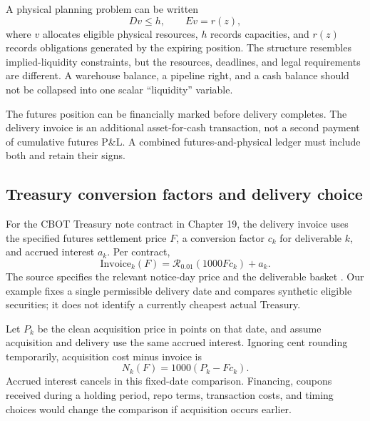 A physical planning problem can be written
\begin{equation}
 Dv\le h,\qquad Ev=r(z),
\end{equation}
where $v$ allocates eligible physical resources, $h$ records capacities, and $r(z)$ records obligations generated by the expiring position. The structure resembles implied-liquidity constraints, but the resources, deadlines, and legal requirements are different. A warehouse balance, a pipeline right, and a cash balance should not be collapsed into one scalar ``liquidity'' variable.

The futures position can be financially marked before delivery completes. The delivery invoice is an additional asset-for-cash transaction, not a second payment of cumulative futures P\&L. A combined futures-and-physical ledger must include both and retain their signs.

\subsection{Treasury conversion factors and delivery choice}

For the CBOT Treasury note contract in Chapter 19, the delivery invoice uses the specified futures settlement price $F$, a conversion factor $c_k$ for deliverable $k$, and accrued interest $a_k$. Per contract,
\begin{equation}
 \mathrm{Invoice}_k(F)=\mathcal R_{0.01}(1000Fc_k)+a_k.
\label{eq:invoice}
\end{equation}
The source specifies the relevant notice-day price and the deliverable basket \citep{CBOT19}. Our example fixes a single permissible delivery date and compares synthetic eligible securities; it does not identify a currently cheapest actual Treasury.

Let $P_k$ be the clean acquisition price in points on that date, and assume acquisition and delivery use the same accrued interest. Ignoring cent rounding temporarily, acquisition cost minus invoice is
\begin{equation}
 N_k(F)=1000(P_k-Fc_k).
\label{eq:ctd}
\end{equation}
Accrued interest cancels in this fixed-date comparison. Financing, coupons received during a holding period, repo terms, transaction costs, and timing choices would change the comparison if acquisition occurs earlier.

